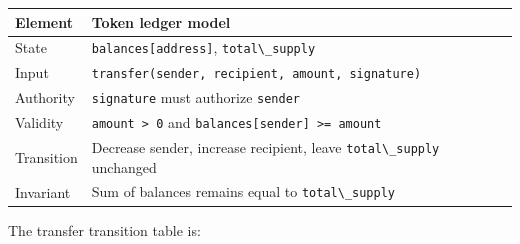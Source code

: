 {\def\LTcaptype{none} %
\begin{longtable}[]{@{}
  >{\raggedright\arraybackslash}p{}
  >{\raggedright\arraybackslash}p{}@{}}
\toprule\noalign{}
\begin{minipage}[b]{\linewidth}\raggedright
Element
\end{minipage} & \begin{minipage}[b]{\linewidth}\raggedright
Token ledger model
\end{minipage} \\
\midrule\noalign{}
\endhead
\bottomrule\noalign{}
\endlastfoot
State & \passthrough{\lstinline!balances[address]!},
\passthrough{\lstinline!total\_supply!} \\
Input &
\passthrough{\lstinline!transfer(sender, recipient, amount, signature)!} \\
Authority & \passthrough{\lstinline!signature!} must authorize
\passthrough{\lstinline!sender!} \\
Validity & \passthrough{\lstinline!amount > 0!} and
\passthrough{\lstinline!balances[sender] >= amount!} \\
Transition & Decrease sender, increase recipient, leave
\passthrough{\lstinline!total\_supply!} unchanged \\
Invariant & Sum of balances remains equal to
\passthrough{\lstinline!total\_supply!} \\
\end{longtable}
}

The transfer transition table is:

